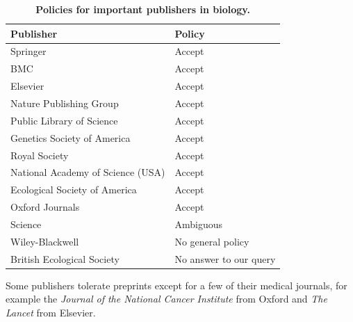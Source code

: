 \documentclass[10pt]{article}
\begin{document}
\begin{table}[!ht]
    \caption{\bf{Policies for important publishers in biology.}}
    \begin{tabular}{|ll|}
    \hline
    Publisher                                   & Policy \\
    \hline
    Springer                            	& Accept \\
    BMC                                 	& Accept \\
    Elsevier                            	& Accept \\
    Nature Publishing Group             	& Accept \\
    Public Library of Science           	& Accept \\
    Genetics Society of America                 & Accept \\
    Royal Society                       	& Accept \\
    National Academy of Science (USA)           & Accept \\
    Ecological Society of America       	& Accept \\
    Oxford Journals                             & Accept \\
    Science                             	& Ambiguous \\
    Wiley-Blackwell                       	& No general policy \\
    British Ecological Society                  & No answer to our query \\
    \hline
    \end{tabular}
    \begin{flushleft} Some publishers tolerate preprints except for a few of
their medical journals, for example the \emph{ Journal of the National Cancer
Institute} from Oxford and \emph{The Lancet} from Elsevier.  \end{flushleft}
    \label{table:policies}
\end{table}
\end{document}
